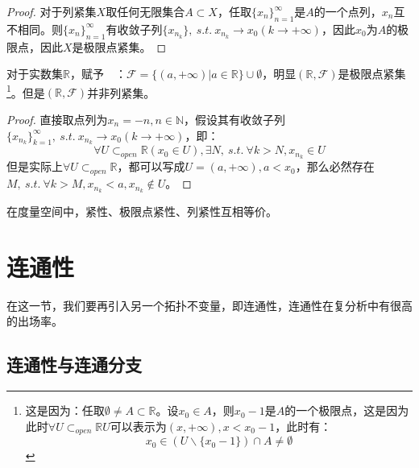 \documentclass[lang=cn,10pt,device=pad]{elegantbook}
\newcommand{\cusong}{\CJKfamily{cusong}}%
\newcommand{\gn}[1]{~\textcolor{mygrn}{\cusong{#1}}~}
\newcommand{\tp}{\mathscr{F}}
\newcommand{\st}{~s.t.~}
\newcommand{\dkh}[1]{\{#1\}}
\newcommand{\chadiao}{\backslash}
\begin{document}
\begin{proof}
	对于列紧集$X$取任何无限集合$ A\subset X$，任取$\dkh{x_{n}}_{n=1}^{\infty}$是$A$的一个点列，$x_{n}$互不相同。则$\dkh{x_{n}}_{n=1}^{\infty}$有收敛子列$\dkh{x_{n_{k}}},\st x_{n_{k}}\to x_{0}(k\to +\infty)$，因此$x_{0}$为$A$的极限点，因此$X$是极限点紧集。
\end{proof}
\begin{example}[列紧性与极限点紧性不等价]
	对于实数集$\mathbb{R}$，赋予\gn{右拓扑}：$\tp = \dkh{(a,+\infty)|a\in \mathbb{R}}\cup\emptyset$，明显$(\mathbb{R},\tp)$是极限点紧集\footnote{这是因为：任取$\emptyset\neq A\subset\mathbb{R}$。设$x_{0}\in A$，则$x_{0}-1$是$A$的一个极限点，这是因为此时$\forall U\subset_{open}\mathbb{R}$$U$可以表示为$(x,+\infty),x<x_{0}-1$，此时有：
	\begin{equation*}
		x_{0}\in (U\chadiao\dkh{x_{0}-1})\cap A \neq \emptyset
	\end{equation*}}。但是$(\mathbb{R},\tp)$并非列紧集。
	\begin{proof}
		直接取点列为$x_{n} = -n,n\in \mathbb{N}$，假设其有收敛子列$\dkh{x_{n_{k}}}_{k=1}^{\infty},\st x_{n_{k}}\to x_{0}(k\to +\infty)$，即：
		\begin{equation*}
			\forall U\subset_{open}\mathbb{R}(x_{0}\in U),\exists N,\st \forall k>N,x_{n_{k}}\in U
		\end{equation*}
		但是实际上$\forall U\subset_{open}\mathbb{R}$，都可以写成$U=(a,+\infty),a<x_{0}$，那么必然存在$M,\st \forall k>M,x_{n_{k}}<a,x_{n_{k}}\notin U$。
	\end{proof}
\end{example}
\begin{theorem}
	在度量空间中，紧性、极限点紧性、列紧性互相等价。
\end{theorem}
\chapter{连通性}
在这一节，我们要再引入另一个拓扑不变量，即连通性，连通性在复分析中有很高的出场率。
\section{连通性与连通分支}
\end{document}
